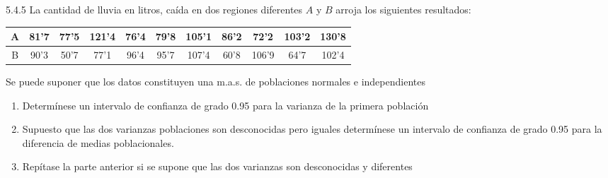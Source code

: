 \begin{problem}{5.4.5}
    La cantidad de lluvia en litros, caída en dos regiones diferentes $A$ y $B$ arroja los siguientes resultados: 
    \begin{center}
        \begin{tabular}{|c|*{10}{c|}}
            \hline
            A & 81'7 & 77'5 & 121'4 & 76'4 & 79'8 & 105'1 & 86'2 & 72'2 & 103'2 & 130'8 \\
            \hline
            B & 90'3 & 50'7 & 77'1 & 96'4 & 95'7 & 107'4 & 60'8 & 106'9 & 64'7 & 102'4 \\
            \hline
        \end{tabular}
    \end{center}

    Se puede suponer que los datos constituyen una m.a.s. de poblaciones normales e independientes
    \begin{enumerate}
        \item Determínese un intervalo de confianza de grado 0.95 para la varianza de la primera población
        \item Supuesto que las dos varianzas poblaciones son desconocidas pero iguales determínese un intervalo de confianza de grado 0.95 para la diferencia de medias poblacionales. 
        \item Repítase la parte anterior si se supone que las dos varianzas son desconocidas y diferentes
    \end{enumerate}
\end{problem}
